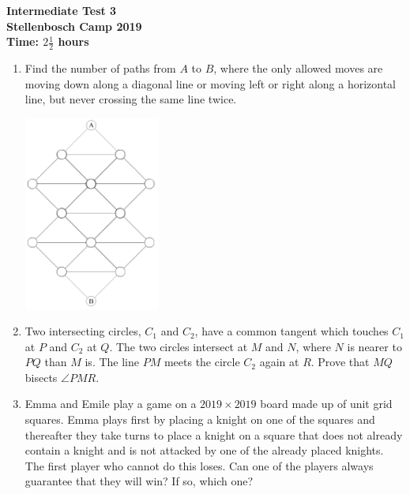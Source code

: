 \documentclass{article}
\begin{document}
	\thispagestyle{empty}
	
	\begin{center}
		\textbf{\Large Intermediate Test 3}
		\\ \vspace{1em}
		\textbf{\large Stellenbosch Camp 2019}
		\\ \vspace{1em}
		\textbf{\large Time: $2\frac{1}{2}$ hours}
	\end{center}
	
	\vspace{6.81mm}
	
	\begin{enumerate}[1.]
		\item %
		Find the number of paths from $A$ to $B$, where the only allowed moves are moving down along a diagonal line or moving left or right along a horizontal line, but never crossing the same line twice.
		
		\begin{center}
			\includegraphics[width=0.35\textwidth]{test_3_q_1}
		\end{center}
		\vspace{6.81mm}

		\item %
		Two intersecting circles, $C_1$ and $C_2$, have a common tangent which touches $C_1$ at $P$ and $C_2$ at $Q$. The two circles intersect at $M$ and $N$, where $N$ is nearer to $PQ$ than $M$ is. The line $PM$ meets the circle $C_2$ again at $R$. Prove that $MQ$ bisects $\angle PMR$.
		\vspace{6.81mm}

		\item %
		Emma and Emile play a game on a $2019 \times 2019$ board made up of unit grid squares. Emma plays first by placing a knight on one of the squares and thereafter they take turns to place a knight on a square that does not already contain a knight and is not attacked by one of the already placed knights. The first player who cannot do this loses. Can one of the players always guarantee that they will win? If so, which one? 
		\vspace{6.81mm}
		

\end{enumerate}
\end{document}
